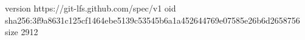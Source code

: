 version https://git-lfs.github.com/spec/v1
oid sha256:3f9a8631c125cf1464ebe5139c53545b6a1a452644769e07585e26b6d2658756
size 2912
